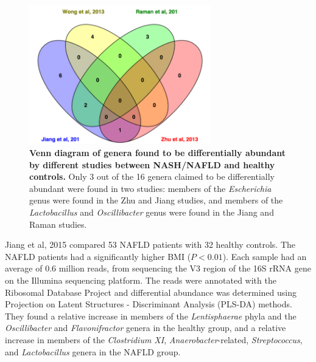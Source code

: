 \begin{figure}[h]
\begin{center}
\includegraphics[width=0.7\textwidth]{nafld_papers.png}
\caption[Venn diagram of genera found to be differentially abundant by different studies between NASH/NAFLD and healthy controls.]{\textbf{Venn diagram of genera found to be differentially abundant by different studies between NASH/NAFLD and healthy controls.} Only 3 out of the 16 genera claimed to be differentially abundant were found in two studies: members of the \textit{Escherichia} genus were found in the Zhu \cite{zhu2013characterization} and Jiang \cite{jiang2015dysbiosis} studies, and members of the \textit{Lactobacillus} and \textit{Oscillibacter} genus were found in the Jiang \cite{jiang2015dysbiosis} and Raman \cite{raman2013fecal} studies.}
\label{nafld_fig1}
\end{center}
\end{figure}

Jiang et al, 2015 \cite{jiang2015dysbiosis} compared 53 NAFLD patients with 32 healthy controls. The NAFLD patients had a significantly higher BMI ($P<0.01$). Each sample had an average of 0.6 million reads, from sequencing the V3 region of the 16S rRNA gene on the Illumina sequencing platform. The reads were annotated with the Ribosomal Database Project \cite{cole2009ribosomal} and differential abundance was determined using Projection on Latent Structures - Discriminant Analysis (PLS-DA) methods. They found a relative increase in members of the \textit{Lentisphaerae} phyla and the \textit{Oscillibacter} and \textit{Flavonifractor} genera in the healthy group, and a relative increase in members of the \textit{Clostridium XI}, \textit{Anaerobacter}-related, \textit{Streptococcus}, and \textit{Lactobacillus} genera in the NAFLD group.

